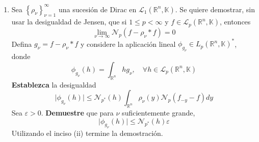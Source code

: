\documentclass[12pt]{report}
\theoremstyle{largebreak}
\newcommand\abs[1]{\ensuremath{\big|#1\big|}}
\newcommand{\N}[2]{\ensuremath{\mathcal{N}_{#1}\left(#2\right)}}
\begin{document}
\begin{excer}
\begin{enumerate}
            \item Sea $\left\{\rho_\nu \right\}_{\nu=1}^\infty$ una sucesión de Dirac en $\mathcal{L}_1(\mathbb{R}^n,\mathbb{K})$. Se quiere demostrar, sin usar la desigualdad de Jensen, que si $1\leq p<\infty$ y $f\in\mathcal{L}_p(\mathbb{R}^n,\mathbb{K})$, entonces
            \begin{equation*}
                \lim_{\nu\rightarrow\infty}\N{p}{f-\rho_\nu*f}=0
            \end{equation*}
            Defina $g_\nu=f-\rho_\nu*f$ y considere la aplicación lineal $\phi_{g_\nu}\in L_{p}(\mathbb{R}^n,\mathbb{K})^*$, donde
            \begin{equation*}
                \phi_{g_\nu}(h)=\int_{\mathbb{R}^n}hg_\nu,\quad\forall h\in \mathcal{L}_p(\mathbb{R}^n,\mathbb{K})
            \end{equation*}
            \textbf{Establezca} la desigualdad
            \begin{equation*}
                \abs{\phi_{g_\nu}(h)}\leq\N{p^*}{h}\int_{\mathbb{R}^n}\rho_\nu(y)\N{p}{f_{-y}-f}dy
            \end{equation*}
            Sea $\varepsilon>0$. \textbf{Demuestre} que para $\nu$ suficientemente grande,
            \begin{equation*}
                \abs{\phi_{g_\nu}(h)}\leq\N{p^*}{h}\varepsilon
            \end{equation*}
            Utilizando el inciso (ii) termine la demostración.
        \end{enumerate}
    \end{excer}
\end{document}
